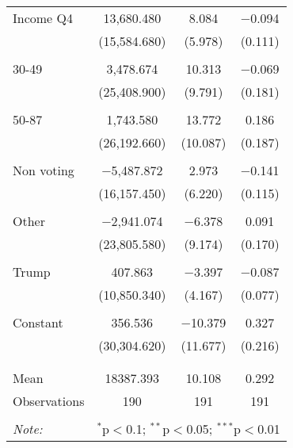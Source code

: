 \begin{tabular}{@{\extracolsep{5pt}}lccc}
 Income Q4 & 13,680.480 & 8.084 & $-$0.094 \\ 
  & (15,584.680) & (5.978) & (0.111) \\ 
  & & & \\ 
 30-49 & 3,478.674 & 10.313 & $-$0.069 \\ 
  & (25,408.900) & (9.791) & (0.181) \\ 
  & & & \\ 
 50-87 & 1,743.580 & 13.772 & 0.186 \\ 
  & (26,192.660) & (10.087) & (0.187) \\ 
  & & & \\ 
 Non voting & $-$5,487.872 & 2.973 & $-$0.141 \\ 
  & (16,157.450) & (6.220) & (0.115) \\ 
  & & & \\ 
 Other & $-$2,941.074 & $-$6.378 & 0.091 \\ 
  & (23,805.580) & (9.174) & (0.170) \\ 
  & & & \\ 
 Trump & 407.863 & $-$3.397 & $-$0.087 \\ 
  & (10,850.340) & (4.167) & (0.077) \\ 
  & & & \\ 
 Constant & 356.536 & $-$10.379 & 0.327 \\ 
  & (30,304.620) & (11.677) & (0.216) \\ 
  & & & \\ 
\hline \\[-1.8ex] 
Mean & 18387.393 & 10.108 & 0.292 \\ 
Observations & 190 & 191 & 191 \\ 
\hline 
\hline \\[-1.8ex] 
\textit{Note:}  & \multicolumn{3}{r}{$^{*}$p$<$0.1; $^{**}$p$<$0.05; $^{***}$p$<$0.01} \\ 
\end{tabular} 
